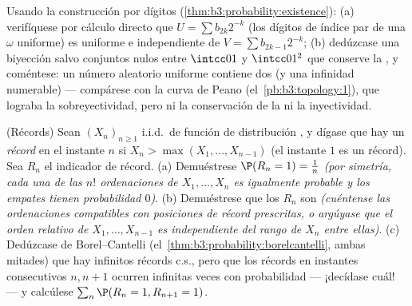 \begin{exercise}[$\star\star$]\label{exo:b3:probability:10}
Usando la construcción por dígitos
(\cref{thm:b3:probability:existence}):
(a) verifíquese por cálculo directo que $U = \sum b_{2k}2^{-k}$ (los
dígitos de índice par de una $\omega$ uniforme) es uniforme e
independiente de
$V = \sum b_{2k-1}2^{-k}$; (b) dedúzcase una biyección
 salvo conjuntos nulos entre
$\intcc01$ y $\intcc01^2$ que conserve la
, y coméntese: un número
aleatorio uniforme contiene dos (y una infinidad numerable)
 --- compárese
con la curva de Peano (el~\cref{pb:b3:topology:1}), que lograba la
sobreyectividad, pero ni la conservación de la  ni la
inyectividad.
\end{exercise}

\begin{exercise}[$\star\star$]\label{exo:b3:probability:11}
(Récords) Sean $(X_n)_{n\geq1}$ i.i.d.\ de función de distribución
, y dígase que hay un
\emph{récord} en el instante $n$ si $X_n > \max(X_1, \dots, X_{n-1})$
(el instante $1$ es un récord). Sea $R_n$ el indicador de récord. (a)
Demuéstrese $\P(R_n = 1) = \frac1n$ \emph{(por simetría, cada una de las
$n!$ ordenaciones de $X_1, \dots, X_n$ es igualmente probable y los
empates tienen probabilidad $0$)}. (b) Demuéstrese que los $R_n$ son
\emph{}
\emph{(cuéntense las ordenaciones compatibles con posiciones de récord
prescritas, o argúyase que el orden relativo de $X_1, \dots, X_{n-1}$ es
independiente del rango de
$X_n$ entre ellas)}. (c) Dedúzcase de Borel--Cantelli
(el~\cref{thm:b3:probability:borelcantelli}, ambas mitades) que hay
infinitos récords c.s., pero que los récords en instantes consecutivos
$n, n+1$ ocurren infinitas veces con probabilidad --- ¡decídase cuál!
--- y calcúlese
$\sum_n\P(R_n = 1, R_{n+1} = 1)$.
\end{exercise}

